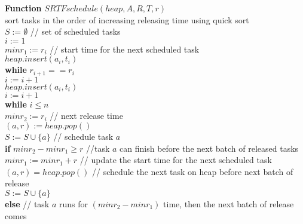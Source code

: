 \documentclass[11pt]{article}
\begin{document}
\begin{enumerate}
\begin{enumerate}
\textbf{Function} $SRTFschedule(heap, A, R, T, r)$\\
\-\hspace{2em} sort tasks in the order of increasing releasing time
using quick sort\\
\-\hspace{2em} $S := \emptyset$ // set of scheduled tasks\\
\-\hspace{2em} $i := 1$ \\
\-\hspace{2em} $minr_1 := r_i$ // start time for the next scheduled task\\
\-\hspace{2em} $heap.insert(a_i,t_i)$ \\
\-\hspace{2em} \textbf{while} $r_{i+1} == r_i$\\
\-\hspace{4em} $i := i + 1$ \\
\-\hspace{4em} $heap.insert(a_i,t_i)$ \\
\-\hspace{2em} $i := i + 1$ \\
\-\hspace{2em} \textbf{while} $i \leq n$\\
\-\hspace{4em} $minr_2 := r_i$ // next release time\\
\-\hspace{4em} $(a,r) := heap.pop()$\\
\-\hspace{4em} $S := S \cup \{a\}$ // schedule task $a$\\
\-\hspace{4em} \textbf{if} $minr_2 - minr_1 \geq r$ //task $a$ can
finish before the next batch of released tasks\\
\-\hspace{6em} $minr_1 := minr_1 + r$ // update the start time for the
next scheduled task\\
\-\hspace{6em} $(a,r) = heap.pop()$ // schedule the next task on heap
before next batch of release \\
\-\hspace{6em} $S := S \cup \{a\}$\\
\-\hspace{4em} \textbf{else} // task $a$ runs for $(minr_2-minr_1)$
time, then the next batch of release comes\\

\end{enumerate}
\end{enumerate}
\end{document}
